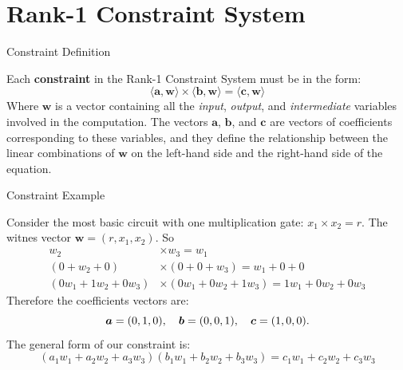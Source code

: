 \documentclass{zkdl-presentation-template}
\begin{document}
    \section{Rank-1 Constraint System}

    \begin{frame}{Constraint Definition}
        \begin{definition}
            Each \textbf{constraint} in the Rank-1 Constraint System must be in the form:
            \begin{equation*}
                \langle \boldsymbol{a}, \boldsymbol{w}\rangle \times \langle \boldsymbol{b}, \boldsymbol{w}\rangle = \langle \boldsymbol{c}, \boldsymbol{w}\rangle
            \end{equation*}
            Where $\boldsymbol{w}$ is a vector containing all the \textit{input}, \textit{output}, and 
            \textit{intermediate} variables involved in the computation. The vectors $\boldsymbol{a}$, 
            $\boldsymbol{b}$, and $\boldsymbol{c}$ are vectors of coefficients corresponding to these variables, 
            and they define the relationship between the linear combinations of $\boldsymbol{w}$ on the 
            left-hand side and the right-hand side of the equation.
        \end{definition}        
    \end{frame}

    \begin{frame}{Constraint Example}
        \begin{example}
            Consider the most basic circuit with one multiplication gate: $x_1 \times x_2 = r$.
            The witnes vector $\boldsymbol{w} = (r, x_1, x_2)$. So
            \vspace{-5pt}
            \begin{align*}
                w_2 &\times w_3 = w_1 \\
                (0 + w_2 + 0) &\times (0 + 0 + w_3) = w_1 + 0 + 0 \\
                (0w_1 + 1w_2 + 0w_3) &\times (0w_1 + 0w_2 + 1w_3) = 1w_1 + 0w_2 + 0w_3
            \end{align*}
            Therefore the coefficients vectors are:
            \vspace{-5pt}
            \begin{equation*}
                \boldsymbol{a} = (0, 1, 0), \quad \boldsymbol{b} = (0, 0, 1), \quad \boldsymbol{c} = (1, 0, 0). 
                \vspace{-5pt}
            \end{equation*}
            The general form of our constraint is:
            \vspace{-5pt}
            \begin{equation*}
                (a_1w_1 + a_2w_2 + a_3w_3)(b_1w_1 + b_2w_2 + b_3w_3) = c_1w_1 + c_2w_2 + c_3w_3
            \end{equation*}
        \end{example}
    \end{frame}
\end{document}
